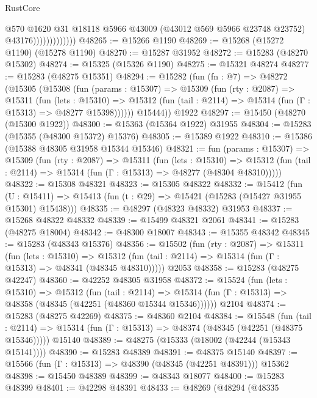 \begin{lexlean}{RustCore}
\begin{coremodule}
                              @570
                              @1620
                              @31
                              @18118
                              @5966
                              @43009
                              (@43012 @569 @5966 @23748 @23752)
                              @43176)))))))))))))
@48265 := @15266 @1190
@48269 := @15268 (@15272 @1190) (@15278 @1190)
@48270 := @15287 @31952
@48272 := @15283 (@48270 @15302)
@48274 := @15325 (@15326 @1190)
@48275 := @15321 @48274
@48277 := @15283 (@48275 @15351)
@48294 := @15282
    (fun (fn : @7) =>
    @48272
      (@15305
        (@15308
          (fun (params : @15307) =>
          @15309
            (fun (rty : @2087) =>
            @15311
              (fun (lets : @15310) =>
              @15312 (fun (tail : @2114) => @15314 (fun (Γ : @15313) => @48277 @15398))))))
        @15444))
    @1922
@48297 := @15450 (@48270 (@15300 @1922))
@48300 := @15363 (@15364 @1922) @31955
@48304 := @15283 (@15355 (@48300 @15372) @15376)
@48305 := @15389 @1922
@48310 := @15386 (@15388 @48305 @31958 @15344 @15346)
@48321 := fun (params : @15307) =>
  @15309
    (fun (rty : @2087) =>
    @15311
      (fun (lets : @15310) =>
      @15312 (fun (tail : @2114) => @15314 (fun (Γ : @15313) => @48277 (@48304 @48310)))))
@48322 := @15308 @48321
@48323 := @15305 @48322
@48332 := @15412
    (fun (U : @15411) => @15413 (fun (t : @29) => @15421 (@15283 (@15427 @31955 @15301) @15438)))
@48335 := @48297 (@48323 @48332) @31953
@48337 := @15268 @48322 @48332
@48339 := @15499 @48321 @2061
@48341 := @15283 (@48275 @18004)
@48342 := @48300 @18007
@48343 := @15355 @48342
@48345 := @15283 (@48343 @15376)
@48356 := @15502
    (fun (rty : @2087) =>
    @15311
      (fun (lets : @15310) =>
      @15312 (fun (tail : @2114) => @15314 (fun (Γ : @15313) => @48341 (@48345 @48310)))))
    @2053
@48358 := @15283 (@48275 @42247)
@48360 := @42252 @48305 @31958
@48372 := @15524
    (fun (lets : @15310) =>
    @15312
      (fun (tail : @2114) =>
      @15314 (fun (Γ : @15313) => @48358 (@48345 (@42251 (@48360 @15344 @15346))))))
    @2104
@48374 := @15283 (@48275 @42269)
@48375 := @48360 @2104
@48384 := @15548
    (fun (tail : @2114) => @15314 (fun (Γ : @15313) => @48374 (@48345 (@42251 (@48375 @15346)))))
    @15140
@48389 := @48275 (@15333 (@18002 (@42244 (@15343 @15141))))
@48390 := @15283 @48389
@48391 := @48375 @15140
@48397 := @15566 (fun (Γ : @15313) => @48390 (@48345 (@42251 @48391))) @15362
@48398 := @15450 @48389
@48399 := @48343 @18077
@48400 := @15283 @48399
@48401 := @42298 @48391
@48433 := @48269
    (@48294
      (@48335

\end{coremodule}
\end{lexlean}
